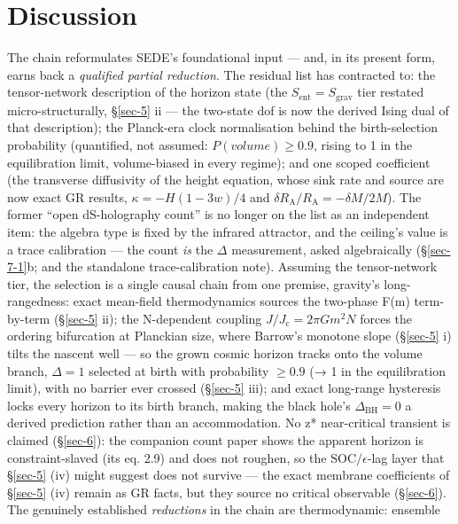 \documentclass[aps,prd,preprint,nofootinbib,superscriptaddress]{revtex4-2}
\begin{document}
\section{Discussion}\label{sec-8}

The chain reformulates SEDE's foundational input --- and, in its present
form, earns back a \emph{qualified partial reduction}. The residual list
has contracted to: the tensor-network description of the horizon state
(the \(S_{\mathrm{ent}} = S_{\mathrm{grav}}\) tier restated
micro-structurally, §\ref{sec-5} ii --- the two-state dof is now the
derived Ising dual of that description); the Planck-era clock
normalisation behind the birth-selection probability (quantified, not
assumed: \(P(volume) \geq  0.9\), rising to 1 in the equilibration
limit, volume-biased in every regime); and one scoped coefficient (the
transverse diffusivity of the height equation, whose sink rate and
source are now exact GR results, \(\kappa  = -H(1-3w)/4\) and
\(\delta R_{\mathrm{A}}/R_{\mathrm{A}} = -\delta M/2M\)). The former
``open dS-holography count'' is no longer on the list as an independent
item: the algebra type is fixed by the infrared attractor, and the
ceiling's value is a trace calibration --- the count \emph{is} the
\(\Delta\) measurement, asked algebraically (§\ref{sec-7-1}b; and the
standalone trace-calibration note). Assuming the tensor-network tier,
the selection is a single causal chain from one premise, gravity's
long-rangedness: exact mean-field thermodynamics sources the two-phase
F(m) term-by-term (§\ref{sec-5} ii); the N-dependent coupling
\(J/J_{\mathrm{c}} = 2\pi Gm^{2}N\) forces the ordering bifurcation at
Planckian size, where Barrow's monotone slope (§\ref{sec-5} i) tilts the
nascent well --- so the grown cosmic horizon tracks onto the volume
branch, \(\Delta  = 1\) selected at birth with probability \(\geq  0.9\)
(→ 1 in the equilibration limit), with no barrier ever crossed
(§\ref{sec-5} iii); and exact long-range hysteresis locks every horizon
to its birth branch, making the black hole's \(\Delta _\mathrm{BH} = 0\)
a derived prediction rather than an accommodation. No z* near-critical
transient is claimed (§\ref{sec-6}): the companion count paper
\cite{Pandev:2026count} shows the apparent horizon is constraint-slaved
(its eq. 2.9) and does not roughen, so the \(\mathrm{SOC}/\epsilon\)-lag
layer that §\ref{sec-5} (iv) might suggest does not survive --- the
exact membrane coefficients of §\ref{sec-5} (iv) remain as GR facts, but
they source no critical observable (§\ref{sec-6}). The genuinely
established \emph{reductions} in the chain are thermodynamic: ensemble
\end{document}
